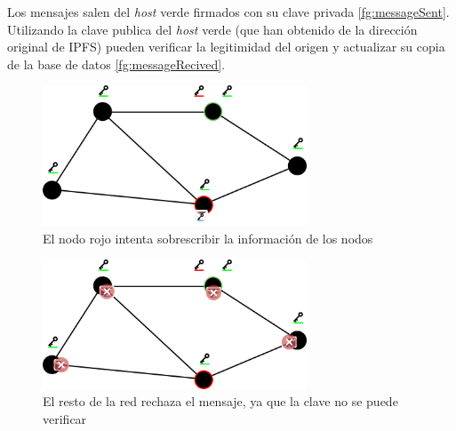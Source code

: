 Los mensajes salen del \textit{host} verde firmados con su clave privada \ref{fg:messageSent}. Utilizando la clave publica del \textit{host} verde (que han obtenido de la dirección original de IPFS) pueden verificar la legitimidad del origen y actualizar su copia de la base de datos \ref{fg:messageRecived}.
\begin{figure}[h!]
    \centering
    \includegraphics[width=0.7\textwidth]{Figures/Message is compromissed.png}
    \caption{El nodo rojo intenta sobrescribir la información de los nodos}
    \label{fg:messageSentRed}
\end{figure}
\begin{figure}[h!]
    \centering
    \includegraphics[width=0.7\textwidth]{Figures/Message rejected.png}
    \caption{El resto de la red rechaza el mensaje, ya que la clave no se puede verificar}
\end{figure}
\newpage
\thispagestyle{empty}